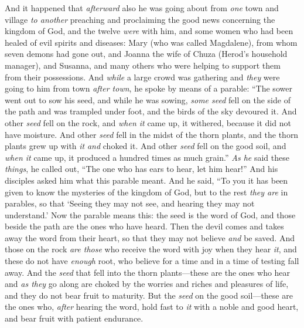 \begin{biblechapter} %
 And it happened that \textit{afterward} also he was going about from \textit{one} town and village \textit{to another} preaching and proclaiming the good news concerning the kingdom of God, and the twelve \textit{were} with him,
\verse and some women who had been healed of evil spirits and diseases: Mary (who was called Magdalene), from whom seven demons had gone out,
\verse and Joanna the wife of Chuza (Herod’s household manager), and Susanna, and many others who were helping to support them from their possessions.
 And \textit{while} a large crowd was gathering and \textit{they} were going to him from town \textit{after town}, he spoke by means of a parable:
\verse “The sower went out to sow his seed, and while he was sowing, \textit{some seed} fell on the side of the path and was trampled under foot, and the birds of the sky devoured it.
\verse And other \textit{seed} fell on the rock, and \textit{when it} came up, it withered, because it did not have moisture.
\verse And other \textit{seed} fell in the midst of the thorn plants, and the thorn plants grew up with \textit{it} \textit{and} choked it.
\verse And other \textit{seed} fell on the good soil, and \textit{when it} came up, it produced a hundred times as much grain.” \textit{As he} said these \textit{things}, he called out, “The one who has ears to hear, let him hear!”
 And his disciples asked him what this parable meant.
\verse And he said, “To you it has been given to know the mysteries of the kingdom of God, but to the rest \textit{they are} in parables, so that ‘Seeing they may not see, 
and hearing they may not understand.’
 Now the parable means this: the seed is the word of God,
\verse and those beside the path are the ones who have heard. Then the devil comes and takes away the word from their heart, so that they may not believe \textit{and} be saved.
\verse And those on the rock \textit{are those} who receive the word with joy when they hear \textit{it}, and these do not have \textit{enough} root, who believe for a time and in a time of testing fall away.
\verse And the \textit{seed} that fell into the thorn plants—these are the ones who hear and \textit{as they} go along are choked by the worries and riches and pleasures of life, and they do not bear fruit to maturity.
\verse But the \textit{seed} on the good soil—these are the ones who, \textit{after} hearing the word, hold fast to \textit{it} with a noble and good heart, and bear fruit with patient endurance.

\end{biblechapter}
